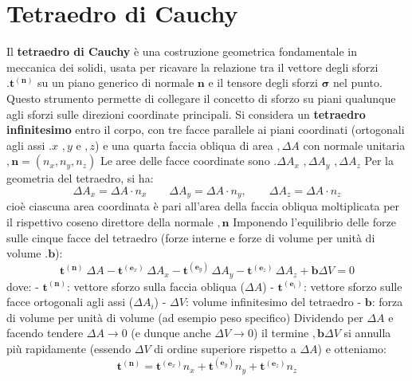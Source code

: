 \section{Tetraedro di Cauchy}

Il \textbf{tetraedro di Cauchy} è una costruzione geometrica fondamentale in meccanica dei solidi, usata per ricavare la relazione tra il vettore degli sforzi $.\mathbf{t}^{(\mathbf{n})}$ su un piano generico di normale $\mathbf{n}$ e il tensore degli sforzi $\mathbf{\sigma}$ nel punto. Questo strumento permette di collegare il concetto di sforzo su piani qualunque agli sforzi sulle direzioni coordinate principali.
Si considera un \textbf{tetraedro infinitesimo} entro il corpo, con tre facce parallele ai piani coordinati (ortogonali agli assi $.x$ $,y$ e $,z$) e una quarta faccia obliqua di area $,\Delta A$ con normale unitaria $,\mathbf{n} = (n_x, n_y, n_z)$ Le aree delle facce coordinate sono $.\Delta A_x$ $,\Delta A_y$ $,\Delta A_z$
Per la geometria del tetraedro, si ha:
\begin{equation*}
\Delta A_x = \Delta A \cdot n_x\qquad
\Delta A_y = \Delta A \cdot n_y, \qquad
\Delta A_z = \Delta A \cdot n_z
\end{equation*}
cioè ciascuna area coordinata è pari all’area della faccia obliqua moltiplicata per il rispettivo coseno direttore della normale $,\mathbf{n}$
Imponendo l’equilibrio delle forze sulle cinque facce del tetraedro (forze interne e forze di volume per unità di volume $.\mathbf{b}$):
\begin{equation*}
\mathbf{t}^{(\mathbf{n})} \ \Delta A
- \mathbf{t}^{(\mathbf{e}_x)} \, \Delta A_x
- \mathbf{t}^{(\mathbf{e}_y)} \, \Delta A_y
- \mathbf{t}^{(\mathbf{e}_z)} \, \Delta A_z
+ \mathbf{b} \Delta V = 0
\end{equation*}
dove:
- $\mathbf{t}^{(\mathbf{n})}$: vettore sforzo sulla faccia obliqua ($\Delta A$)
- $\mathbf{t}^{(\mathbf{e}_i)}$: vettore sforzo sulle facce ortogonali agli assi ($\Delta A_i$)
- $\Delta V$: volume infinitesimo del tetraedro
- $\mathbf{b}$: forza di volume per unità di volume (ad esempio peso specifico)
Dividendo per $\Delta A$ e facendo tendere $\Delta A \to 0$ (e dunque anche $\Delta V \to 0$) il termine $,\mathbf{b}\Delta V$ si annulla più rapidamente (essendo $\Delta V$ di ordine superiore rispetto a $\Delta A$) e otteniamo:
\begin{equation*}
\mathbf{t}^{(\mathbf{n})} =
\mathbf{t}^{(\mathbf{e}_x)} n_x +
\mathbf{t}^{(\mathbf{e}_y)} n_y +
\mathbf{t}^{(\mathbf{e}_z)} n_z
\end{equation*}
